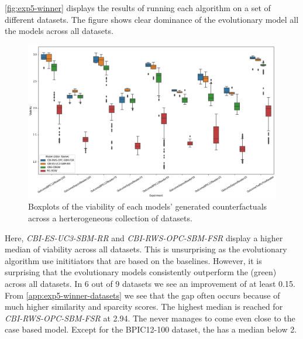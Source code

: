 \documentclass[./../../paper.tex]{subfiles}
\begin{document}
\autoref{fig:exp5-winner} displays the results of running each algorithm on a set of different datasets. The figure shows clear dominance of the evolutionary model all the models across all datasets. 

\begin{figure}[htbp]
    \centering
    \includegraphics[width=\textwidth]{figures/generated/exp5_winner_overall.png}
    \caption{Boxplots of the viability of each models' generated counterfactuals across a herterogeneous collection of datasets.}
    \label{fig:exp5-winner}
\end{figure}

Here, \emph{CBI-ES-UC3-SBM-RR} and \emph{CBI-RWS-OPC-SBM-FSR} display a higher median of viability across all datasets. This is unsurprising as the evolutionary algorithm use inititiators that are based on the baselines. However, it is surprising that the evolutionary models consistently outperform the \ModelCBG (green) across all datasets. In 6 out of 9 datasets we see an improvement of at least 0.15. From \autoref{app:exp5-winner-datasets} we see that the gap often occurs because of much higher similarity and sparcity scores. The highest median is reached for \emph{CBI-RWS-OPC-SBM-FSR} at 2.94. The \ModelRNG never manages to come even close to the case based model. Except for the BPIC12-100 dataset, the \ModelRNG has a median below 2. 

\end{document}
